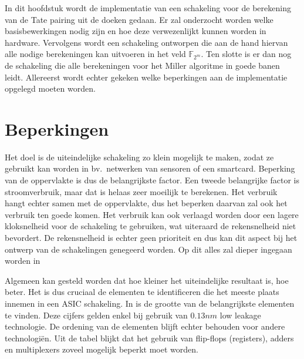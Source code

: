 
In dit hoofdstuk wordt de implementatie van een schakeling voor de berekening van de Tate pairing uit de doeken gedaan. Er zal onderzocht worden welke basisbewerkingen nodig zijn en hoe deze verwezenlijkt kunnen worden in hardware. Vervolgens wordt een schakeling ontworpen die aan de hand hiervan alle nodige berekeningen kan uitvoeren in het veld $\mathbb{F}_{2^m}$. Ten slotte is er dan nog de schakeling die alle berekeningen voor het Miller algoritme in goede banen leidt. Allereerst wordt echter gekeken welke beperkingen aan de implementatie opgelegd moeten worden.

\section{Beperkingen\label{sectie-implementatie-beperkingen}}

Het doel is de uiteindelijke schakeling zo klein mogelijk te maken, zodat ze gebruikt kan worden in bv.\ netwerken van sensoren of een smartcard. Beperking van de oppervlakte is dus de belangrijkste factor. Een tweede belangrijke factor is stroomverbruik, maar dat is helaas zeer moeilijk te berekenen. Het verbruik hangt echter samen met de oppervlakte, dus het beperken daarvan zal ook het verbruik ten goede komen. Het verbruik kan ook verlaagd worden door een lagere kloksnelheid voor de schakeling te gebruiken, wat uiteraard de rekensnelheid niet bevordert. De rekensnelheid is echter geen prioriteit en dus kan dit aspect bij het ontwerp van de schakelingen genegeerd worden. Op dit alles zal dieper ingegaan worden in 

Algemeen kan gesteld worden dat hoe kleiner het uiteindelijke resultaat is, hoe beter. Het is dus cruciaal de elementen te identificeren die het meeste plaats innemen in een ASIC schakeling. In  is de grootte van de belangrijkste elementen te vinden. Deze cijfers gelden enkel bij gebruik van $0.13 nm$ low leakage technologie. De ordening van de elementen blijft echter behouden voor andere technologi\"en. Uit de tabel blijkt dat het gebruik van flip-flops (registers), adders en multiplexers zoveel mogelijk beperkt moet worden.

